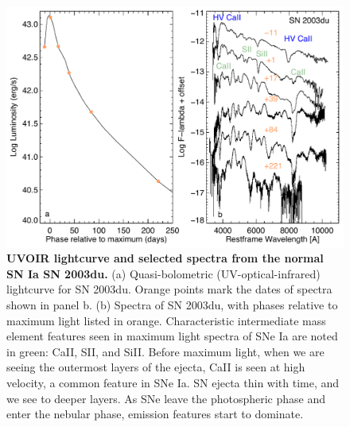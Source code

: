 \documentclass{nature1}
\begin{document}
\begin{figure}
\includegraphics[width=7in]{fluxspec.pdf} 
\caption{\textsf{ {\bf \textsf{UVOIR lightcurve and selected spectra from the normal SN
    Ia SN 2003du.}}  (a) Quasi-bolometric (UV-optical-infrared)
  lightcurve for SN 2003du\citep{2007A&A...469..645S}.  Orange points
  mark the dates of spectra shown in panel b. (b) Spectra of SN
  2003du\citep{2007A&A...469..645S}, with phases relative to maximum
  light listed in orange.  Characteristic intermediate mass element
  features seen in maximum light spectra of SNe Ia are noted in green:
  CaII, SII, and SiII.  Before maximum light, when we are seeing the
  outermost layers of the ejecta, CaII is seen at high velocity, a
  common feature in SNe Ia.  SN ejecta thin with time, and we see to
  deeper layers.  As SNe leave the photospheric phase and enter the
  nebular phase, emission features start to dominate.}}
\label{fluxspec}
\end{figure}
\end{document}

